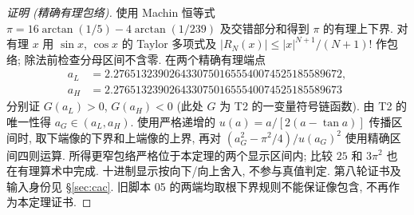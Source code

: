 \begin{proof}[证明 (精确有理包络)]
使用 Machin 恒等式
$\pi=16\arctan(1/5)-4\arctan(1/239)$ 及交错部分和得到 $\pi$ 的有理上下界.
对有理 $x$ 用 $\sin x$, $\cos x$ 的 Taylor 多项式及
$|R_N(x)|\le |x|^{N+1}/(N+1)!$ 作包络; 除法前检查分母区间不含零.
在两个精确有理端点
\begin{align*}
 a_L&=2.27651323902643307501655540074525185589672,\\
 a_H&=2.27651323902643307501655540074525185589673
\end{align*}
分别证 $G(a_L)>0$, $G(a_H)<0$ (此处 $G$ 为 T2 的一变量符号链函数).
由 T2 的唯一性得 $a_G\in(a_L,a_H)$. 使用严格递增的
$u(a)=a/[2(a-\tan a)]$ 传播区间时, 取下端像的下界和上端像的上界,
再对 $(a_G^2-\pi^2/4)/u(a_G)^2$ 使用精确区间四则运算.
所得更窄包络严格位于本定理的两个显示区间内; 比较 $25$ 和 $3\pi^2$
也在有理算术中完成. 十进制显示按向下/向上舍入, 不参与真值判定.
第八轮证书及输入身份见 §\ref{sec:cac}.
旧脚本 05 的两端均取根下界规则不能保证像包含, 不再作为本定理证书.
\end{proof}


